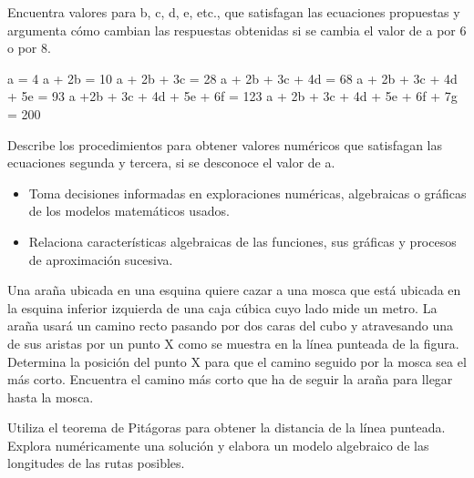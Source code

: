 \ejemplo

Encuentra valores para b, c, d, e, etc., que satisfagan las ecuaciones propuestas y argumenta cómo cambian las respuestas obtenidas si se cambia el valor de a por 6 o por 8.

a = 4 a + 2b = 10 a + 2b + 3c = 28 a + 2b + 3c + 4d = 68 a + 2b + 3c + 4d + 5e = 93 a +2b + 3c + 4d + 5e + 6f = 123 a + 2b + 3c + 4d + 5e + 6f + 7g = 200

Describe los procedimientos para obtener valores numéricos que satisfagan las ecuaciones segunda y tercera, si se desconoce el valor de a.



\evidencias

\begin{itemize}
  \item Toma decisiones informadas en exploraciones numéricas, algebraicas o gráficas de los modelos matemáticos usados.
  \item Relaciona características algebraicas de las funciones, sus gráficas y procesos de aproximación sucesiva.
\end{itemize}

\ejemplo

Una araña ubicada en una esquina quiere cazar a una mosca que está ubicada en la esquina inferior izquierda de una caja cúbica cuyo lado mide un metro. La araña usará un camino recto pasando por dos caras del cubo y atravesando una de sus aristas por un punto X como se muestra en la línea punteada de la figura. Determina la posición del punto X para que el camino seguido por la mosca sea el más corto. Encuentra el camino más corto que ha de seguir la araña para llegar hasta la mosca.


Utiliza el teorema de Pitágoras para obtener la distancia de la línea punteada. Explora numéricamente una solución y elabora un modelo algebraico de las longitudes de las rutas posibles.



